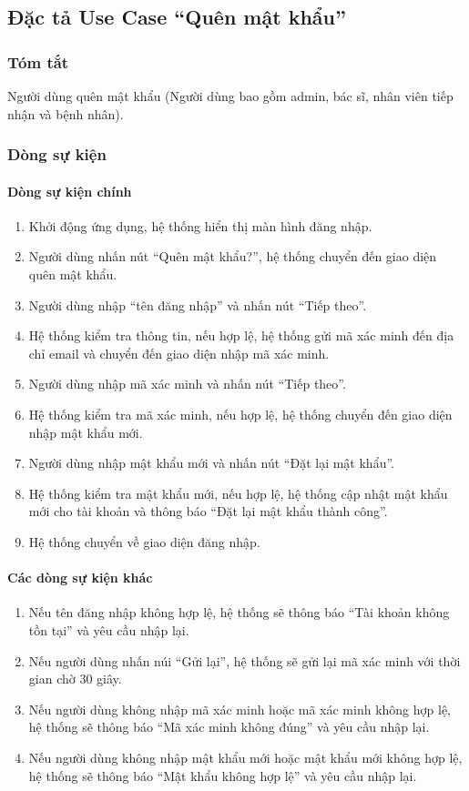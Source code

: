 \subsection{Đặc tả Use Case ``Quên mật khẩu''}

\subsubsection{Tóm tắt}
Người dùng quên mật khẩu (Người dùng bao gồm admin, bác sĩ, nhân viên tiếp nhận và bệnh nhân).

\subsubsection{Dòng sự kiện}
\paragraph{\textbf{Dòng sự kiện chính}}
\begin{enumerate}
    \item Khởi động ứng dụng, hệ thống hiển thị màn hình đăng nhập.
    \item Người dùng nhấn nút ``Quên mật khẩu?'', hệ thống chuyển đến giao diện quên mật khẩu.
    \item Người dùng nhập ``tên đăng nhập'' và nhấn nút ``Tiếp theo''.
    \item Hệ thống kiểm tra thông tin, nếu hợp lệ, hệ thống gửi mã xác minh đến địa chỉ email và chuyển đến giao diện nhập mã xác minh.
    \item Người dùng nhập mã xác minh và nhấn nút ``Tiếp theo''.
    \item Hệ thống kiểm tra mã xác minh, nếu hợp lệ, hệ thống chuyển đến giao diện nhập mật khẩu mới.
    \item Người dùng nhập mật khẩu mới và nhấn nút ``Đặt lại mật khẩu''.
    \item Hệ thống kiểm tra mật khẩu mới, nếu hợp lệ, hệ thống cập nhật mật khẩu mới cho tài khoản và thông báo ``Đặt lại mật khẩu thành công''.
    \item Hệ thống chuyển về giao diện đăng nhập.
\end{enumerate}

\paragraph{\textbf{Các dòng sự kiện khác}}
\begin{enumerate}
    \item Nếu tên đăng nhập không hợp lệ, hệ thống sẽ thông báo ``Tài khoản không tồn tại'' và yêu cầu nhập lại.
    \item Nếu người dùng nhấn núi ``Gửi lại'', hệ thống sẽ gửi lại mã xác minh với thời gian chờ 30 giây.
    \item Nếu người dùng không nhập mã xác minh hoặc mã xác minh không hợp lệ, hệ thống sẽ thông báo ``Mã xác minh không đúng'' và yêu cầu nhập lại.
    \item Nếu người dùng không nhập mật khẩu mới hoặc mật khẩu mới không hợp lệ, hệ thống sẽ thông báo ``Mật khẩu không hợp lệ'' và yêu cầu nhập lại.
\end{enumerate}

